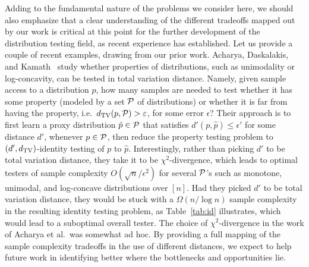 Adding to the fundamental nature of the problems we consider here, we should also emphasize that a clear understanding of the different tradeoffs mapped out by our work is critical at this point for the further development of the distribution testing field, as recent experience has established. Let us provide a couple of recent examples, drawing from our prior work. Acharya, Daskalakis, and Kamath~\cite{AcharyaDK15} study whether properties of distributions, such as unimodality or log-concavity, can be tested in total variation distance. Namely, given sample access to a distribution $p$, how many samples are needed to test whether it has some property (modeled by a set ${\cal P}$ of distributions) or whether it is far from having the property, i.e.~$d_{\rm TV}(p,{\cal P})>\epsilon$, for some  error $\epsilon$? Their approach is to first learn a proxy distribution $\hat{p} \in {\cal P}$ that satisfies $d'(p,\hat{p}) \le \epsilon'$ for some distance $d'$, whenever $p \in {\cal P}$, then reduce the property testing problem to $(d',d_{\rm TV})$-identity testing  of $p$ to $\hat{p}$. Interestingly, rather than picking $d'$ to be total variation distance, they take it to be $\chi^2$-divergence, which leads to optimal testers of sample complexity $O(\sqrt{n}/\epsilon^2)$ for several ${\cal P}$'s such as monotone, unimodal, and log-concave distributions over $[n]$. Had they picked $d'$ to be total variation distance, they would be stuck with a $\Omega(n/\log n)$ sample complexity in the resulting identity testing problem, as Table~\ref{tab:id} illustrates, which would lead to a suboptimal overall tester. The choice of $\chi^2$-divergence in the work of Acharya et al.~was somewhat ad hoc. By providing a full mapping of the sample complexity tradeoffs in the use of different distances, we expect to help future work in identifying better where the bottlenecks and opportunities lie.

